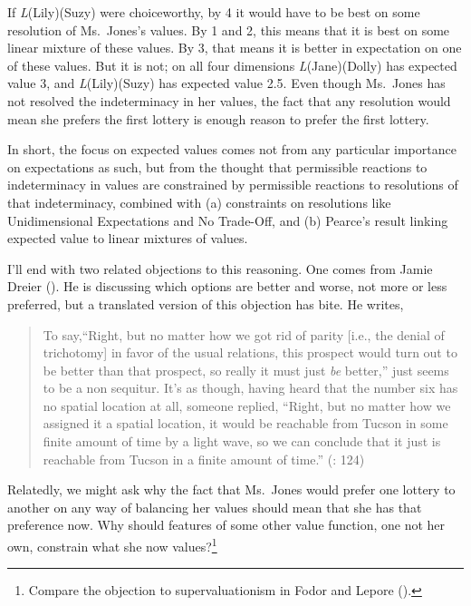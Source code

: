 \documentclass[
  11pt,
  letterpaper,
  DIV=11,
  numbers=noendperiod,
  twoside]{scrartcl}
\begin{document}
If \emph{L}(Lily)(Suzy) were choiceworthy, by 4 it would have to be best
on some resolution of Ms.~Jones's values. By 1 and 2, this means that it
is best on some linear mixture of these values. By 3, that means it is
better in expectation on one of these values. But it is not; on all four
dimensions \emph{L}(Jane)(Dolly) has expected value 3, and
\emph{L}(Lily)(Suzy) has expected value 2.5. Even though Ms.~Jones has
not resolved the indeterminacy in her values, the fact that any
resolution would mean she prefers the first lottery is enough reason to
prefer the first lottery.

In short, the focus on expected values comes not from any particular
importance on expectations as such, but from the thought that
permissible reactions to indeterminacy in values are constrained by
permissible reactions to resolutions of that indeterminacy, combined
with (a) constraints on resolutions like Unidimensional Expectations and
No Trade-Off, and (b) Pearce's result linking expected value to linear
mixtures of values.

I'll end with two related objections to this reasoning. One comes from
Jamie Dreier (). He is discussing which
options are better and worse, not more or less preferred, but a
translated version of this objection has bite. He writes,

\begin{quote}
To say,``Right, but no matter how we got rid of parity {[}i.e., the
denial of trichotomy{]} in favor of the usual relations, this prospect
would turn out to be better than that prospect, so really it must just
\emph{be} better,'' just seems to be a non sequitur. It's as though,
having heard that the number six has no spatial location at all, someone
replied, ``Right, but no matter how we assigned it a spatial location,
it would be reachable from Tucson in some finite amount of time by a
light wave, so we can conclude that it just is reachable from Tucson in
a finite amount of time.'' (: 124)
\end{quote}

Relatedly, we might ask why the fact that Ms.~Jones would prefer one
lottery to another on any way of balancing her values should mean that
she has that preference now. Why should features of some other value
function, one not her own, constrain what she now values?\footnote{Compare
  the objection to supervaluationism in Fodor and Lepore
  ().}
\end{document}
